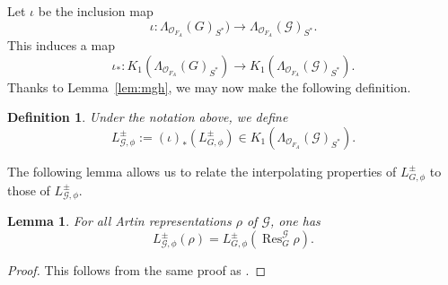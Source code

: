 \documentclass{amsart}
\newtheorem{lemma}[theorem]{Lemma}
\newtheorem{definition}[theorem]{Definition}
\begin{document}
Let $\iota$ be the inclusion map
\[
\iota:\Lambda_{{\mathcal{O}}_{F_A}}(G)_{S^*})\rightarrow \Lambda_{{\mathcal{O}}_{F_A}}({\mathcal{G}})_{S^*}.
\]
This induces a map
\[
\iota_*:K_1(\Lambda_{{\mathcal{O}}_{F_A}}(G)_{S^*})\rightarrow K_1(\Lambda_{{\mathcal{O}}_{F_A}}({\mathcal{G}})_{S^*}).
\]
Thanks to Lemma~\ref{lem:mgh}, we may now make the following definition.

\begin{definition}
Under the notation above, we define
\[
L_{{\mathcal{G}},\phi}^\pm:=(\iota)_*\left(L^\pm_{G,\phi}\right)\in K_1(\Lambda_{{\mathcal{O}}_{F_A}}({\mathcal{G}})_{S^*}).
\]
\end{definition}

The following lemma allows us to relate the interpolating properties of $L^\pm_{G,\phi}$ to those of $L_{{\mathcal{G}},\phi}^\pm$.

\begin{lemma}\label{lem:sameres}
For all Artin representations $\rho$ of ${\mathcal{G}}$, one has
\[
L_{{\mathcal{G}},\phi}^\pm(\rho)=L^\pm_{G,\phi}\left(\operatorname{Res}^{\mathcal{G}}_G\rho\right).
\]
\end{lemma}
\begin{proof}
This follows from the same proof as \cite[Lemma~2.9]{bv10}.
\end{proof}
\end{document}
